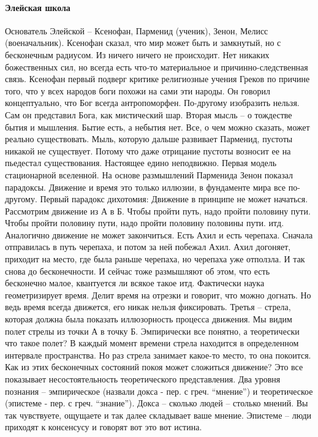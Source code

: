 \documentclass[a4paper, 12pt]{article}
\begin{document}
\paragraph{Элейская школа} Основатель Элейской -- Ксенофан, Парменид (ученик), Зенон, Мелисс (военачальник). Ксенофан сказал, что мир может быть и замкнутый, но с бесконечным радиусом. Из ничего ничего не происходит. Нет никаких божественных сил, но всегда есть что-то материальное и причинно-следственная связь. Ксенофан первый подверг критике религиозные учения Греков по причине того, что у всех народов боги похожи на сами эти народы. Он говорил концептуально, что Бог всегда антропоморфен. По-другому изобразить нельзя. Сам он представил Бога, как мистический шар. Вторая мысль -- о тождестве бытия и мышления. Бытие есть, а небытия нет. Все, о чем можно сказать, может реально существовать. Мыль, которую дальше развивает Парменид, пустоты никакой не существует. Потому что даже отрицание пустоты возносит ее на пьедестал существования. Настоящее едино неподвижно. Первая модель стационарной вселенной. На основе размышлений Парменида Зенон показал парадоксы. Движение и время это только иллюзии, в фундаменте мира все по-другому. Первый парадокс дихотомия: Движение в принципе не может начаться. Рассмотрим движение из А в Б. Чтобы пройти путь, надо пройти половину пути. Чтобы пройти половину пути, надо пройти половину половины пути. итд. Аналогично движение не может закончиться. Есть Ахил и есть черепаха. Сначала отправилась в путь черепаха, и потом за ней побежал Ахил. Ахил догоняет, приходит на место, где была раньше черепаха, но черепаха уже отползла. И так снова до бесконечности. И сейчас тоже размышляют об этом, что есть бесконечно малое, квантуется ли всякое такое итд. Фактически наука геометризирует время. Делит время на отрезки и говорит, что можно догнать. Но ведь время всегда движется, его никак нельзя фиксировать. Третья -- стрела, которая должна была показать иллюзорность процесса движения. Мы видим полет стрелы из точки А в точку Б. Эмпирически все понятно, а теоретически что такое полет? В каждый момент времени стрела находится в определенном интервале пространства. Но раз стрела занимает какое-то место, то она покоится. Как из этих бесконечных состояний покоя может сложиться движение? Это все показывает несостоятельность теоретического представления. Два уровня познания -- эмпирическое (назвали докса - пер. с греч. ``мнение'') и теоретическое (эпистеме - пер. с греч. ``знание''). Докса -- сколько людей -- столько мнений. Вы так чувствуете, ощущаете и так далее складывает ваше мнение. Эпистеме -- люди приходят к консенсусу и говорят вот это вот истина. 
\end{document}
